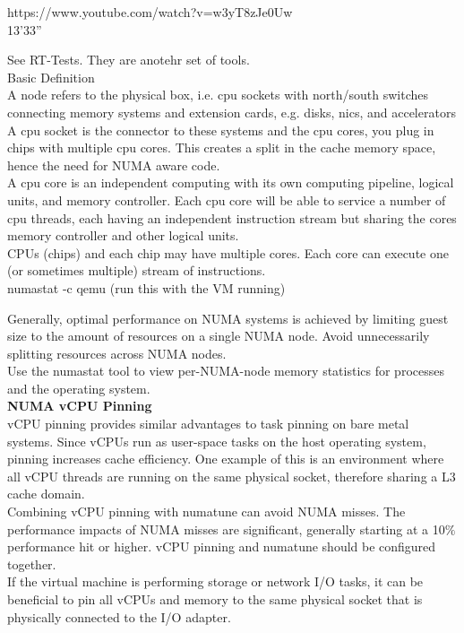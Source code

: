 \documentclass[11pt, a4paper, oneside]{article}
\theoremstyle{definition}
\begin{document}
https://www.youtube.com/watch?v=w3yT8zJe0Uw\\
13'33''

See RT-Tests. They are anotehr set of tools.\\

Basic Definition\\

A node refers to the physical box, i.e. cpu sockets with north/south switches connecting memory systems and extension cards, e.g. disks, nics, and accelerators\\

A cpu socket is the connector to these systems and the cpu cores, you plug in chips with multiple cpu cores. This creates a split in the cache memory space, hence the need for NUMA aware code.\\

A cpu core is an independent computing with its own computing pipeline, logical units, and memory controller. Each cpu core will be able to service a number of cpu threads, each having an independent instruction stream but sharing the cores memory controller and other logical units.\\

CPUs (chips) and each chip may have multiple cores. Each core can execute one (or sometimes multiple) stream of instructions.\\

numastat -c qemu (run this with the VM running)

Generally, optimal performance on NUMA systems is achieved by limiting guest size to the amount of resources on a single NUMA node. Avoid unnecessarily splitting resources across NUMA nodes.\\
Use the numastat tool to view per-NUMA-node memory statistics for processes and the operating system.\\

\textbf{NUMA vCPU Pinning}\\
 vCPU pinning provides similar advantages to task pinning on bare metal systems. Since vCPUs run as user-space tasks on the host operating system, pinning increases cache efficiency. One example of this is an environment where all vCPU threads are running on the same physical socket, therefore sharing a L3 cache domain.\\
Combining vCPU pinning with numatune can avoid NUMA misses. The performance impacts of NUMA misses are significant, generally starting at a 10$\%$ performance hit or higher. vCPU pinning and numatune should be configured together.\\
If the virtual machine is performing storage or network I/O tasks, it can be beneficial to pin all vCPUs and memory to the same physical socket that is physically connected to the I/O adapter. \\
\end{document}
